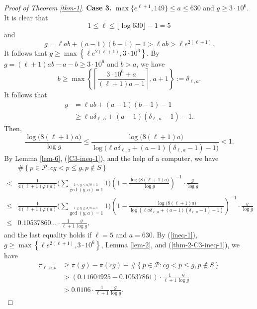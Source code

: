 \documentclass[12pt,a4paper,reqno]{amsart}
\numberwithin{equation}{section}
\def\cP{{\mathcal P}}
\theoremstyle{plain}
\theoremstyle{definition}
\begin{document}
\begin{proof}[Proof of Theorem \ref{thm-1}]
	\textbf{Case 3.} $\max\{e^{\ell+1},149\}\leq a\leq 630$ and $g\geq 3\cdot 10^{6}$. It is clear that 
	$$
	1\leq\ell\leq \lfloor \log 630 \rfloor-1=5
	$$
	and 
	$$
	g=\ell ab+(a-1)(b-1)-1>\ell ab> \ell e^{2(\ell+1)}.
	$$
	It follows that $g\geq \max\left\{\ell e^{2(\ell+1)}, 3\cdot 10^{6}\right\}.$
	By $g=(\ell+1) ab-a-b\geq 3\cdot 10^{6}$ and $b>a$, we have 
	$$
	b\geq \max\left\{\left\lceil \frac{3\cdot 10^{6}+a}{(\ell+1)a-1} \right\rceil, a+1 \right\}
	:=\delta_{\ell,a}.
	$$
	It follows that
	\begin{align}
		g&= \ell ab+(a-1)(b-1)-1\nonumber\\
		&\geq\ell a\delta_{\ell,a} +(a-1)(\delta_{\ell,a}-1)-1.
	\end{align}
	Then,
	\begin{equation}\label{C3-ineq-1}
		\frac{\log \big(8(\ell+1)a\big)}{\log g}
		\leq \frac{\log\big(8(\ell+1)a\big)}{\log \big(\ell a\delta_{\ell,a} +(a-1)(\delta_{\ell,a}-1)-1 \big)}<1.
	\end{equation}
	By Lemma \ref{lem-6}, (\ref{C3-ineq-1}), and the help of a computer, we have 
	\begin{align}\label{thm-2-C3-ineq-1}
		&\#\left\{p\in\cP:cg< p\leq g, p\notin S \right\}\nonumber\\
		<& \frac{1}{4(\ell+1)\varphi(a)} \Bigg(\sum_{\stackrel{1\leq y\leq a/8+1}{\gcd(y,a)=1} }1\Bigg) \left( 1-\frac{\log \big(8(\ell+1)a\big)}{\log g}\right)^{-1}\cdot \frac{g}{\log g}\nonumber\\
		\leq & \frac{1}{4(\ell+1)\varphi(a)} \Bigg(\sum_{\stackrel{1\leq y\leq a/8+1}{\gcd(y,a)=1} }1\Bigg) \left( 1-\frac{\log\big(8(\ell+1)a\big)}{\log \left(\ell a\delta_{\ell,a} +(a-1)(\delta_{\ell,a}-1)-1 \right)} \right)^{-1}\cdot \frac{g}{\log g}\nonumber\\
		\leq & 0.10537860\ldots\cdot \frac{1}{\ell+1}\frac{g}{\log g},
	\end{align}
		and the last equality holds if $\ell=5$ and $a=630$.
	By (\ref{ineq-1}), $g \geq \max\left\{\ell e^{2(\ell+1)},3\cdot 10^{6}\right\}$, Lemma \ref{lem-2}, and (\ref{thm-2-C3-ineq-1}), we have
	\begin{align*}
		\pi_{\ell,a,b}
		&\geq \pi(g)-\pi(cg)-\#\left\{p\in\mathcal{P}: cg< p\leq g, p\notin S\right\}\\
		&> (0.11604925- 0.10537861)\cdot \frac{1}{\ell+1}\frac{g}{\log g}\\
		&> 0.0106 \cdot \frac{1}{\ell+1}\frac{g}{\log g}.
	\end{align*}
	

\end{proof}
\end{document}
